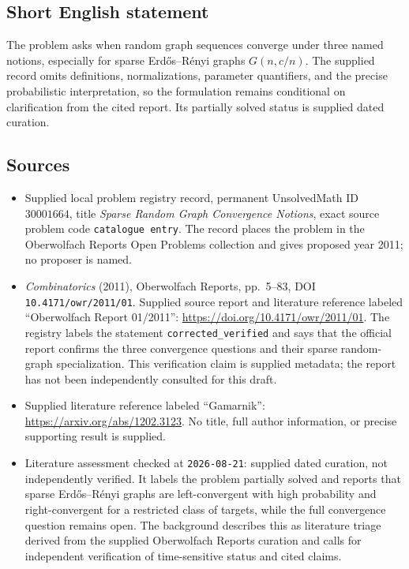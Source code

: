 \documentclass[11pt]{article}
\begin{document}
\subsection{Short English statement}
The problem asks when random graph sequences converge under three named notions, especially for sparse Erd\H{o}s--R\'enyi graphs \(G(n,c/n)\). The supplied record omits definitions, normalizations, parameter quantifiers, and the precise probabilistic interpretation, so the formulation remains conditional on clarification from the cited report. Its partially solved status is supplied dated curation.
\subsection{Sources}
\begin{itemize}
\item Supplied local problem registry record, permanent UnsolvedMath ID \(30001664\), title \emph{Sparse Random Graph Convergence Notions}, exact source problem code \texttt{catalogue entry}. The record places the problem in the Oberwolfach Reports Open Problems collection and gives proposed year 2011; no proposer is named.
\item \emph{Combinatorics} (2011), Oberwolfach Reports, pp.~5--83, DOI \texttt{10.4171/owr/2011/01}. Supplied source report and literature reference labeled ``Oberwolfach Report 01/2011'': \url{https://doi.org/10.4171/owr/2011/01}. The registry labels the statement \texttt{corrected\_verified} and says that the official report confirms the three convergence questions and their sparse random-graph specialization. This verification claim is supplied metadata; the report has not been independently consulted for this draft.
\item Supplied literature reference labeled ``Gamarnik'': \url{https://arxiv.org/abs/1202.3123}. No title, full author information, or precise supporting result is supplied.
\item Literature assessment checked at \texttt{2026-08-21}: supplied dated curation, not independently verified. It labels the problem partially solved and reports that sparse Erd\H{o}s--R\'enyi graphs are left-convergent with high probability and right-convergent for a restricted class of targets, while the full convergence question remains open. The background describes this as literature triage derived from the supplied Oberwolfach Reports curation and calls for independent verification of time-sensitive status and cited claims.
\end{itemize}
\end{document}
